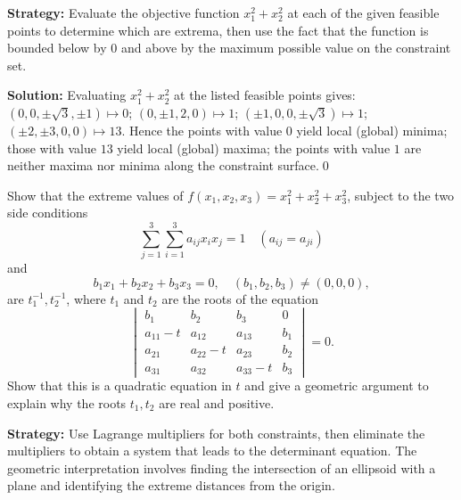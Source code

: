 \noindent\textbf{Strategy:} Evaluate the objective function $x_1^2+x_2^2$ at each of the given feasible points to determine which are extrema, then use the fact that the function is bounded below by 0 and above by the maximum possible value on the constraint set.

\bigskip\noindent\textbf{Solution:}
Evaluating $x_1^2+x_2^2$ at the listed feasible points gives: $(0,0,\pm\sqrt3,\pm1)\mapsto 0$; $(0,\pm1,2,0)\mapsto 1$; $(\pm1,0,0,\pm\sqrt3)\mapsto 1$; $(\pm2,\pm3,0,0)\mapsto 13$. Hence the points with value $0$ yield local (global) minima; those with value $13$ yield local (global) maxima; the points with value $1$ are neither maxima nor minima along the constraint surface.\qed


\begin{problembox}
\begin{problemstatement}
Show that the extreme values of \(f(x_1, x_2, x_3) = x_1^2 + x_2^2 + x_3^2\), subject to the two side conditions
\[ \sum_{j=1}^3 \sum_{i=1}^3 a_{ij} x_i x_j = 1 \quad (a_{ij} = a_{ji}) \]
and
\[ b_1 x_1 + b_2 x_2 + b_3 x_3 = 0, \quad (b_1, b_2, b_3) \neq (0, 0, 0), \]
are \(t_1^{-1}, t_2^{-1}\), where \(t_1\) and \(t_2\) are the roots of the equation
\[\begin{vmatrix}
b_1 & b_2 & b_3 & 0 \\
a_{11} - t & a_{12} & a_{13} & b_1 \\
a_{21} & a_{22} - t & a_{23} & b_2 \\
a_{31} & a_{32} & a_{33} - t & b_3
\end{vmatrix} = 0.\]
Show that this is a quadratic equation in \(t\) and give a geometric argument to explain why the roots \(t_1, t_2\) are real and positive.
\end{problemstatement}
\end{problembox}

\noindent\textbf{Strategy:} Use Lagrange multipliers for both constraints, then eliminate the multipliers to obtain a system that leads to the determinant equation. The geometric interpretation involves finding the intersection of an ellipsoid with a plane and identifying the extreme distances from the origin.

